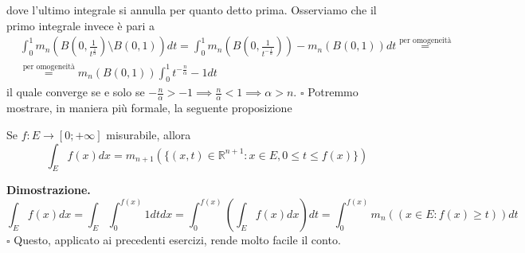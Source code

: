 	dove l'ultimo integrale si annulla per quanto detto prima. Osserviamo che il primo integrale invece è pari a
	\[\begin{aligned}
	&\int_0^1 m_n \left(B \left(0, \frac{1}{t^{\frac{1}{\alpha}}} \right) \setminus B(0,1) \right)dt = \int_0^1 m_n \left( B \left(0, \frac{1}{t^{-\frac{1}{\alpha}}}\right) \right) - m_n(B(0, 1))dt \stackrel{\text{per omogeneità}}{=} \\
	&\stackrel{\text{per omogeneità}}{=} m_n(B(0,1))\int_0^1 t^{-\frac{n}{\alpha}} - 1 dt
	\end{aligned}\]
	il quale converge se e solo se $-\frac{n}{\alpha} > - 1 \implies \frac{n}{\alpha} < 1 \implies \alpha > n$.
\hfill $\square$
%
Potremmo mostrare, in maniera più formale, la seguente proposizione
%
\vspace{0.5cm}
\begin{prop}
	Se $f: E \to [0; +\infty]$ misurabile, allora
$$
\int_E f(x)dx = m_{n+1}(\{(x,t) \in \mathbb{R}^{n+1}: x \in E, 0 \leq t \leq f(x) \})
$$
\end{prop}
%
\noindent \textbf{Dimostrazione. }
$$
\int_E f(x)dx = \int_E \int_0^{f(x)} 1 dtdx = \int_0^{f(x)} \left( \int_E f(x) dx \right) dt = \int_0^{f(x)} m_n({(x \in E: f(x) \geq t)})dt
$$
\hfill $\square$
%
Questo, applicato ai precedenti esercizi, rende molto facile il conto.
%
\vspace{0.5cm}
